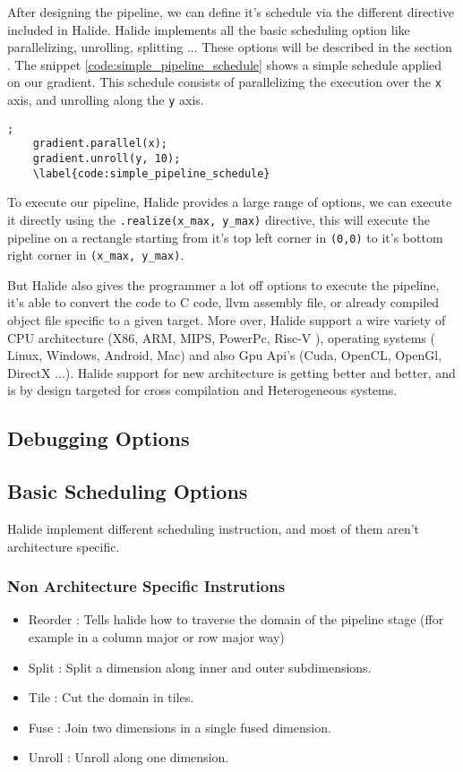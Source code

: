 	After designing the  pipeline, we can define it's schedule via the different directive included in Halide. Halide implements all the basic scheduling option like parallelizing, unrolling, splitting ... These options will be described in the section 
	. The snippet 
	\ref{code:simple_pipeline_schedule} 
	shows a simple schedule applied on our gradient. This schedule consists of parallelizing the execution over the \texttt{x} axis, and unrolling along the  \texttt{y} axis.

	\begin{lstlisting}[caption={Simple Pipeline Example}, captionpos=b,label={code:simple_pipeline_schedule}];
	gradient.parallel(x);
	gradient.unroll(y, 10);
	\label{code:simple_pipeline_schedule}
	\end{lstlisting}


	To execute our pipeline, Halide provides a large range of options, we can execute it directly using the \verb|.realize(x_max, y_max)| directive, this will execute the pipeline on a rectangle starting from it's top left corner in  \verb|(0,0)| to it's bottom right corner in \verb|(x_max, y_max)|.
	
	But Halide also gives the programmer a lot off options to execute the pipeline, it's able to convert the code to C code, llvm assembly file, or already compiled object file specific to a given target. More over, Halide support a wire variety of CPU architecture (X86, ARM, MIPS, PowerPc, Risc-V  ), operating systems ( Linux, Windows, Android, Mac) and also Gpu Api's (Cuda, OpenCL, OpenGl, DirectX ...). Halide support for new architecture is getting better and better, and is by design targeted for cross compilation and Heterogeneous systems.

	\subsection{Debugging Options}

	\subsection {Basic Scheduling Options}
	\label{section:scheduling}
	Halide implement different scheduling instruction, and most of them aren't architecture specific. 
	\subsubsection{Non Architecture Specific Instrutions}
	\begin{itemize}
		\item Reorder : Tells halide how to traverse the domain of the pipeline stage (ffor example in a column major or row major way)
		\item Split   : Split a dimension along inner and outer subdimensions.
		\item Tile    : Cut the domain in tiles.
		\item Fuse    : Join two dimensions in a single fused dimension.
		\item Unroll  : Unroll along one dimension.
	\end{itemize}

